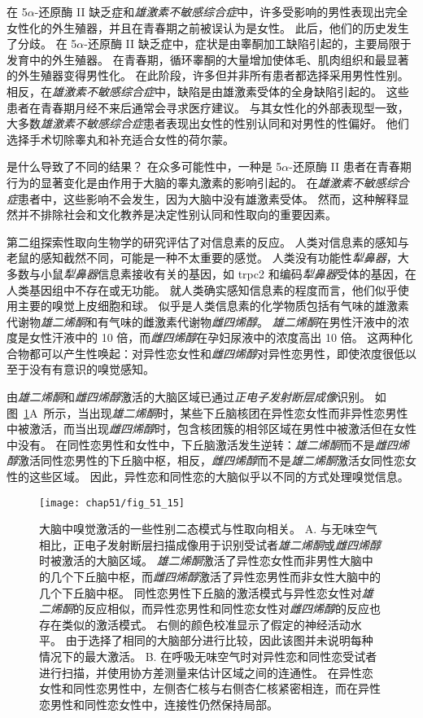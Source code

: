 在 5$\alpha$-还原酶 II 缺乏症和\textit{雄激素不敏感综合症}中，许多受影响的男性表现出完全女性化的外生殖器，并且在青春期之前被误认为是女性。
此后，他们的历史发生了分歧。
在 5$\alpha$-还原酶 II 缺乏症中，症状是由睾酮加工缺陷引起的，主要局限于发育中的外生殖器。
在青春期，循环睾酮的大量增加使体毛、肌肉组织和最显著的外生殖器变得男性化。
在此阶段，许多但并非所有患者都选择采用男性性别。
相反，在\textit{雄激素不敏感综合症}中，缺陷是由雄激素受体的全身缺陷引起的。
这些患者在青春期月经不来后通常会寻求医疗建议。
与其女性化的外部表现型一致，大多数\textit{雄激素不敏感综合症}患者表现出女性的性别认同和对男性的性偏好。
他们选择手术切除睾丸和补充适合女性的荷尔蒙。


是什么导致了不同的结果？
在众多可能性中，一种是 5$\alpha$-还原酶 II 患者在青春期行为的显著变化是由作用于大脑的睾丸激素的影响引起的。
在\textit{雄激素不敏感综合症}患者中，这些影响不会发生，因为大脑中没有雄激素受体。
然而，这种解释显然并不排除社会和文化教养是决定性别认同和性取向的重要因素。


第二组探索性取向生物学的研究评估了对信息素的反应。
人类对信息素的感知与老鼠的感知截然不同，可能是一种不太重要的感觉。
人类没有功能性\textit{犁鼻器}，大多数与小鼠\textit{犁鼻器}信息素接收有关的基因，如 trpc2 和编码\textit{犁鼻器}受体的基因，在人类基因组中不存在或无功能。
就人类确实感知信息素的程度而言，他们似乎使用主要的嗅觉上皮细胞和球。
似乎是人类信息素的化学物质包括有气味的雄激素代谢物\textit{雄二烯酮}和有气味的雌激素代谢物\textit{雌四烯醇}。
\textit{雄二烯酮}在男性汗液中的浓度是女性汗液中的 10 倍，而\textit{雌四烯醇}在孕妇尿液中的浓度高出 10 倍。
这两种化合物都可以产生性唤起：对异性恋女性和\textit{雌四烯醇}对异性恋男性，即使浓度很低以至于没有有意识的嗅觉感知。


由\textit{雄二烯酮}和\textit{雌四烯醇}激活的大脑区域已通过\textit{正电子发射断层成像}识别。
如图~\ref{fig:51_15}A~所示，当出现\textit{雄二烯酮}时，某些下丘脑核团在异性恋女性而非异性恋男性中被激活，而当出现\textit{雌四烯醇}时，包含核团簇的相邻区域在男性中被激活但在女性中没有。
在同性恋男性和女性中，下丘脑激活发生逆转：\textit{雄二烯酮}而不是\textit{雌四烯醇}激活同性恋男性的下丘脑中枢，相反，\textit{雌四烯醇}而不是\textit{雄二烯酮}激活女同性恋女性的这些区域。
因此，异性恋和同性恋的大脑似乎以不同的方式处理嗅觉信息。


\begin{figure}[htbp]
	\centering
	\texttt{[image: chap51/fig\_51\_15]}
	\caption{大脑中嗅觉激活的一些性别二态模式与性取向相关。
		A. 与无味空气相比，正电子发射断层扫描成像用于识别受试者\textit{雄二烯酮}或\textit{雌四烯醇}时被激活的大脑区域。
		\textit{雄二烯酮}激活了异性恋女性而非男性大脑中的几个下丘脑中枢，而\textit{雌四烯醇}激活了异性恋男性而非女性大脑中的几个下丘脑中枢。
		同性恋男性下丘脑的激活模式与异性恋女性对\textit{雄二烯酮}的反应相似，而异性恋男性和同性恋女性对\textit{雌四烯醇}的反应也存在类似的激活模式。
		右侧的颜色校准显示了假定的神经活动水平。
		由于选择了相同的大脑部分进行比较，因此该图并未说明每种情况下的最大激活\cite{berglund2006brain}。
		B. 在呼吸无味空气时对异性恋和同性恋受试者进行扫描，并使用协方差测量来估计区域之间的连通性。
		在异性恋女性和同性恋男性中，左侧杏仁核与右侧杏仁核紧密相连，而在异性恋男性和同性恋女性中，连接性仍然保持局部\cite{savic2008pet}。}
	\label{fig:51_15}
\end{figure}


